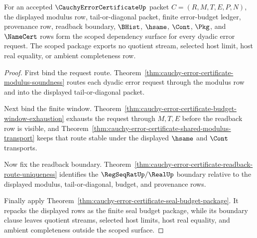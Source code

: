 \begin{theorem}
\label{thm:cauchy-error-certificate-scoped-budget-window-package}
For an accepted $\CauchyErrorCertificateUp$ packet $C=(R,M,T,E,P,N)$, the displayed modulus row, tail-or-diagonal packet, finite error-budget ledger, provenance row, readback boundary, $\BHist$, $\hsame$, $\Cont$, $\Pkg$, and $\NameCert$ rows form the scoped dependency surface for every dyadic error request. The scoped package exports no quotient stream, selected host limit, host real equality, or ambient completeness row.
\end{theorem}
\begin{proof}
First bind the request route. Theorem~\ref{thm:cauchy-error-certificate-modulus-soundness} routes each dyadic error request through the modulus row and into the displayed tail-or-diagonal packet.

Next bind the finite window. Theorem~\ref{thm:cauchy-error-certificate-budget-window-exhaustion} exhausts the request through $M,T,E$ before the readback row is visible, and Theorem~\ref{thm:cauchy-error-certificate-shared-modulus-transport} keeps that route stable under the displayed $\hsame$ and $\Cont$ transports.

Now fix the readback boundary. Theorem~\ref{thm:cauchy-error-certificate-readback-route-uniqueness} identifies the $\RegSeqRatUp/\RealUp$ boundary relative to the displayed modulus, tail-or-diagonal, budget, and provenance rows.

Finally apply Theorem~\ref{thm:cauchy-error-certificate-seal-budget-package}. It repacks the displayed rows as the finite seal budget package, while its boundary clause leaves quotient streams, selected host limits, host real equality, and ambient completeness outside the scoped surface.
\end{proof}

